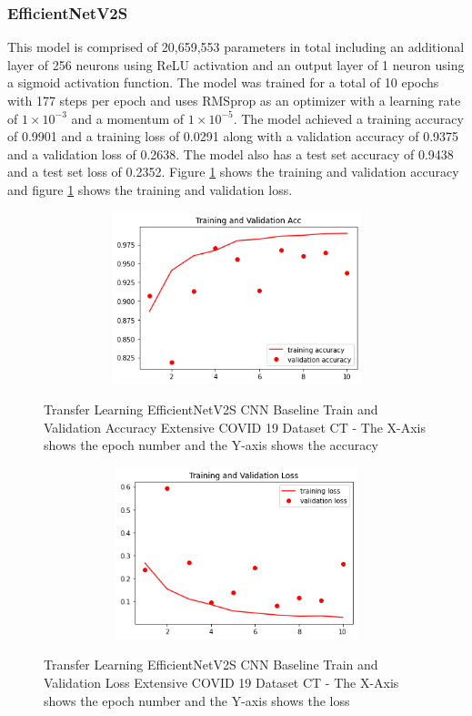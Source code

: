 \subsubsection{EfficientNetV2S}
This model is comprised of 20,659,553 parameters in total including an additional layer of 256 neurons using ReLU activation and an output layer of 1 neuron using a sigmoid activation function.  The model was trained for a total of 10 epochs with 177 steps per epoch and uses RMSprop as an optimizer with a learning rate of $1\times10^{-3}$ and a momentum of $1\times10^{-5}$.  The model achieved a training accuracy of 0.9901 and a training loss of 0.0291 along with a validation accuracy of 0.9375 and a validation loss of 0.2638.  The model also has a test set accuracy of 0.9438 and a test set loss of 0.2352. Figure \ref{fig:EfficientNetV2S CNN Baseline Train and Validation Accuracy Extensive COVID 19 Dataset CT} shows the training and validation accuracy and figure \ref{fig:EfficientNetV2S CNN Baseline Train and Validation Accuracy Extensive COVID 19 Dataset CT} shows the training and validation loss.
 \begin{figure}[H]
    \centering    \includegraphics[width=1\textwidth,height=5cm,keepaspectratio]{Images/EfficientNetV2SBaselineTrainingValidationAccuracyExtensiveCT.png}\\
    \caption{Transfer Learning EfficientNetV2S CNN Baseline Train and Validation Accuracy Extensive COVID 19 Dataset CT - The X-Axis shows the epoch number and the Y-axis shows the accuracy}
    \label{fig:EfficientNetV2S CNN Baseline Train and Validation Accuracy Extensive COVID 19 Dataset CT}
\end{figure}
 \begin{figure}[H]
    \centering
    \includegraphics[width=1\textwidth,height=5cm,keepaspectratio]{Images/EfficientNetV2SBaselineTrainingValidationLossExtensiveCT.png}\\
    \caption{Transfer Learning EfficientNetV2S CNN Baseline Train and Validation Loss Extensive COVID 19 Dataset CT - The X-Axis shows the epoch number and the Y-axis shows the loss}
    \label{fig:EfficientNetV2S CNN Baseline Train and Validation Loss Extensive COVID 19 Dataset CT}
\end{figure}

